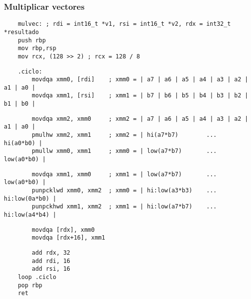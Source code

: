 \documentclass[aspectratio=169]{beamer}
\begin{document}
\begin{frame}[fragile]
    \frametitle{Multiplicar vectores}
    \scriptsize
    \begin{verbatim}
    mulvec: ; rdi = int16_t *v1, rsi = int16_t *v2, rdx = int32_t *resultado
    push rbp
    mov rbp,rsp
    mov rcx, (128 >> 2) ; rcx = 128 / 8
    \end{verbatim}
    \vspace{-0.8cm} \pause
    \begin{verbatim}
    .ciclo:
        movdqa xmm0, [rdi]    ; xmm0 = | a7 | a6 | a5 | a4 | a3 | a2 | a1 | a0 |
        movdqa xmm1, [rsi]    ; xmm1 = | b7 | b6 | b5 | b4 | b3 | b2 | b1 | b0 |
    \end{verbatim}
    \vspace{-0.8cm} \pause
    \begin{verbatim}
        movdqa xmm2, xmm0     ; xmm2 = | a7 | a6 | a5 | a4 | a3 | a2 | a1 | a0 |
        pmulhw xmm2, xmm1     ; xmm2 = | hi(a7*b7)        ...        hi(a0*b0) |
        pmullw xmm0, xmm1     ; xmm0 = | low(a7*b7)       ...       low(a0*b0) |
    \end{verbatim}
    \vspace{-0.8cm} \pause
    \begin{verbatim}
        movdqa xmm1, xmm0     ; xmm1 = | low(a7*b7)       ...       low(a0*b0) |
        punpcklwd xmm0, xmm2  ; xmm0 = | hi:low(a3*b3)    ...    hi:low(0a*b0) |
        punpckhwd xmm1, xmm2  ; xmm1 = | hi:low(a7*b7)    ...    hi:low(a4*b4) |
    \end{verbatim}
    \vspace{-0.8cm} \pause
    \begin{verbatim}
        movdqa [rdx], xmm0
        movdqa [rdx+16], xmm1
    \end{verbatim}
    \vspace{-0.8cm} \pause
    \begin{verbatim}
        add rdx, 32
        add rdi, 16
        add rsi, 16
    loop .ciclo
    pop rbp
    ret
    \end{verbatim}
\end{frame}
\end{document}

